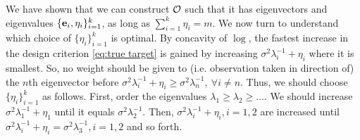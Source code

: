 \documentclass{amsart}
\numberwithin{equation}{section}
\begin{document}
We have shown that we can construct $\mathcal{O}$ such that it has
eigenvectors and eigenvalues $\{\mathbf{e}_i, \eta_i\}_{i=1}^k$, as long as
$\sum_{i=1}^k \eta_i = m$. We now turn to understand which choice of
$\{\eta_i\}_{i=1}^k$ is optimal. By concavity of $\log$, the fastest
increase in the design criterion \eqref{eq:true target} is gained by
increasing $\sigma^2\lambda_i^{-1} + \eta_i$ where it is smallest. So,
no weight should be given to (i.e. observation taken in direction of)
the $n$th eigenvector before $\sigma^2\lambda_i^{-1} + \eta_i \geq
\sigma^2\lambda_n^{-1},\ \forall i \neq n$. Thus, we should choose
$\{\eta_i\}_{i=1}^k$ as follows. First, order the eigenvalues
$\lambda_1 \geq \lambda_2 \geq \dots$. We should increase $\sigma^2
\lambda_1^{-1} + \eta_1$ until it equals
$\sigma^2\lambda_2^{-1}$. Then, $\sigma^2 \lambda_i^{-1} +
\eta_i,i=1,2$ are increased until $\sigma^2 \lambda_i^{-1} + \eta_i =
\sigma^2\lambda_3^{-1},i=1,2$ and so forth.


\optimalvsnot
\end{document}
